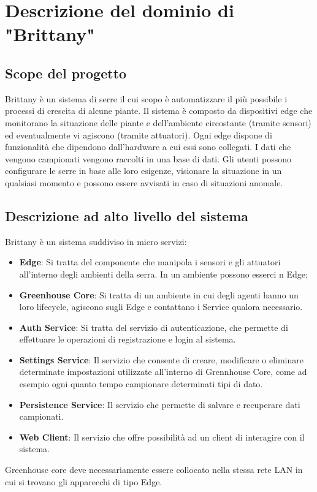 \section{Descrizione del dominio di "Brittany"}

\subsection{Scope del progetto}

Brittany è un sistema di serre il cui scopo è automatizzare il più possibile i processi di crescita di alcune piante. Il sistema è composto da dispositivi edge che monitorano la situazione delle piante e dell'ambiente circostante (tramite sensori) ed eventualmente vi agiscono (tramite attuatori). Ogni edge dispone di funzionalità che dipendono dall'hardware a cui essi sono collegati.
I dati che vengono campionati vengono raccolti in una base di dati. Gli utenti possono configurare le serre in base alle loro esigenze, visionare la situazione in un qualsiasi momento e possono essere avvisati in caso di situazioni anomale.

\subsection{Descrizione ad alto livello del sistema}
Brittany è un sistema suddiviso in micro servizi:
\begin{itemize}
	\item \textbf{Edge}: Si tratta del componente che manipola i sensori e gli attuatori all’interno degli ambienti della serra. In un ambiente possono esserci n Edge;
	\item \textbf{Greenhouse Core}: Si tratta di un ambiente in cui degli agenti hanno un loro lifecycle, agiscono sugli Edge e contattano i Service qualora necessario.
	\item \textbf{Auth Service}: Si tratta del servizio di autenticazione, che permette di effettuare le operazioni di registrazione e login al sistema.
	\item \textbf{Settings Service}: Il servizio che consente di creare, modificare o eliminare determinate impostazioni utilizzate all’interno di Grennhouse Core, come ad esempio ogni quanto tempo campionare determinati tipi di dato.
	\item \textbf{Persistence Service}: Il servizio che permette di salvare e recuperare dati campionati.
	\item \textbf{Web Client}: Il servizio che offre possibilità ad un client di interagire con il sistema.
\end{itemize}
Greenhouse core deve necessariamente essere collocato nella stessa rete LAN in cui si trovano gli apparecchi di tipo Edge.

